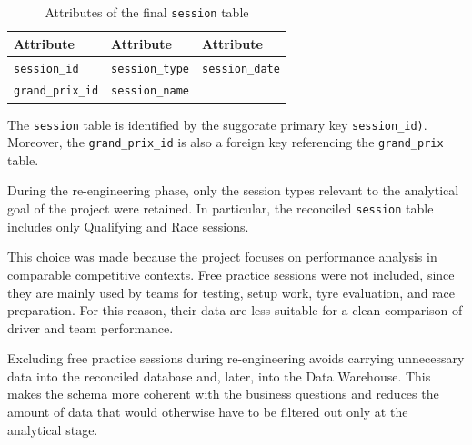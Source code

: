 \documentclass[12pt,a4paper]{article}
\begin{document}
	\begin{table}[H]
		\centering
		\caption{Attributes of the final \texttt{session} table}
		\renewcommand{\arraystretch}{1.15}
		\begin{tabularx}{0.9\textwidth}{>{\raggedright\arraybackslash}X >{\raggedright\arraybackslash}X >{\raggedright\arraybackslash}X}
			\toprule
			\textbf{Attribute} & \textbf{Attribute} & \textbf{Attribute} \\
			\midrule
			\texttt{session\_id}  & \texttt{session\_type} & \texttt{session\_date} \\
			\texttt{grand\_prix\_id} & \texttt{session\_name} &  \\
			\bottomrule
		\end{tabularx}
	\end{table}
		
	The \texttt{session} table is identified by the suggorate primary key \texttt{session\_id)}.
	Moreover, the \texttt{grand\_prix\_id} is also a foreign key referencing the \texttt{grand\_prix} table.
	
	
	During the re-engineering phase, only the session types relevant to the analytical goal of the project were retained.
	In particular, the reconciled \texttt{session} table includes only Qualifying and Race sessions.
	
	This choice was made because the project focuses on performance analysis in comparable competitive contexts.
	Free practice sessions were not included, since they are mainly used by teams for testing, setup work, tyre evaluation, and race preparation.
	For this reason, their data are less suitable for a clean comparison of driver and team performance.
	
	Excluding free practice sessions during re-engineering avoids carrying unnecessary data into the reconciled database and, later, into the Data Warehouse.
	This makes the schema more coherent with the business questions and reduces the amount of data that would otherwise have to be filtered out only at the analytical stage.
	
\end{document}
